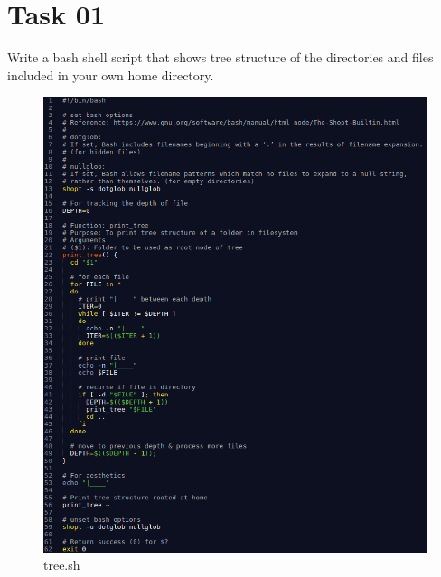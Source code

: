 \documentclass[12pt,a4paper]{article}
\begin{document}
\section{Task 01}
Write a bash shell script that shows tree structure of the directories and files included in your own home directory.

\begin{figure}[!h]
	\centering
	\includegraphics[width=6in]{task01.png}
	\caption{tree.sh}
\end{figure}

\newpage
\end{document}
